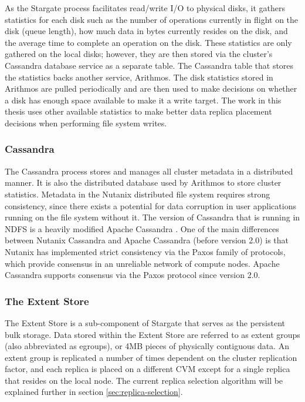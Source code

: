 \documentclass[12pt]{article}
\begin{document}
    As the Stargate process facilitates read/write I/O to physical disks, it
    gathers statistics for each disk such as the number of operations currently
    in flight on the disk (queue length), how much data in bytes currently
    resides on the disk, and the average time to complete an operation on the
    disk. These statistics are only gathered on the local disks; however, they
    are then stored via the cluster's Cassandra database service as a separate
    table. The Cassandra table that stores the statistics backs another
    service, Arithmos. The disk statistics stored in Arithmos are pulled
    periodically and are then used to make decisions on whether a disk has
    enough space available to make it a write target. The work in this thesis
    uses other available statistics to make better data replica placement
    decisions when performing file system writes.

    \subsubsection{Cassandra}

    The Cassandra process stores and manages all cluster metadata in a
    distributed manner. It is also the distributed database used by Arithmos to
    store cluster statistics. Metadata in the Nutanix distributed file system
    requires strong consistency, since there exists a potential for data
    corruption in user applications running on the file system without it.  The
    version of Cassandra that is running in NDFS is a heavily modified Apache
    Cassandra \cite{cassandra}. One of the main differences between Nutanix
    Cassandra and Apache Cassandra (before version 2.0) is that Nutanix has
    implemented strict consistency via the Paxos \cite{paxos2005} family of
    protocols, which provide consensus in an unreliable network of compute
    nodes. Apache Cassandra supports consensus via the Paxos protocol since
    version 2.0. 

    \subsubsection{The Extent Store}

    The Extent Store is a sub-component of Stargate that serves as the
    persistent bulk storage. Data stored within the Extent Store are referred
    to as extent groups (also abbreviated as egroups), or 4MB pieces of
    physically contiguous data. An extent group is replicated a number of
    times dependent on the cluster replication factor, and each replica is
    placed on a different CVM except for a single replica that resides on the
    local node. The current replica selection algorithm will be explained
    further in section \ref{sec:replica-selection}.
\end{document}
